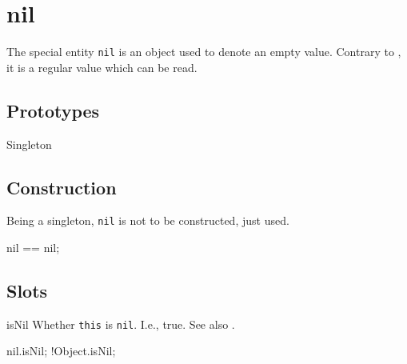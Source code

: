 
\section{nil}

The special entity \lstinline|nil| is an object used to denote an
empty value.  Contrary to , it is a regular value
which can be read.

\subsection{Prototypes}

\begin{refObjects}
\item[Singleton]
\end{refObjects}

\subsection{Construction}

Being a singleton, \lstinline|nil| is not to be constructed, just used.

\begin{urbiassert}[firstnumber=1]
nil == nil;
\end{urbiassert}

\subsection{Slots}

\begin{urbiscriptapi}
\item[isNil]
  Whether \lstinline|this| is \lstinline|nil|.  I.e., true.  See also
  .
\begin{urbiassert}
nil.isNil;
!Object.isNil;
\end{urbiassert}

\end{urbiscriptapi}


